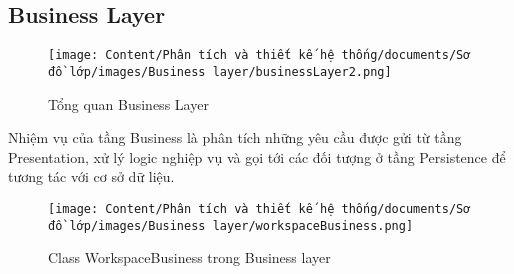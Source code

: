 \subsection{Business Layer}

\begin{figure}[H]
    \centering
    \texttt{[image: Content/Phân tích và thiết kế hệ thống/documents/Sơ đồ lớp/images/Business layer/businessLayer2.png]}
    \vspace{0.5cm}
    \caption{Tổng quan Business Layer}
    \label{fig:Tổng quan Business Layer}
\end{figure}

Nhiệm vụ của tầng Business là phân tích những yêu cầu được gửi từ tầng Presentation, xử lý logic nghiệp vụ và
gọi tới các đối tượng ở tầng Persistence để tương tác với cơ sở dữ liệu.

\begin{figure}[H]
    \centering
    \texttt{[image: Content/Phân tích và thiết kế hệ thống/documents/Sơ đồ lớp/images/Business layer/workspaceBusiness.png]}
    \vspace{0.5cm}
    \caption{Class WorkspaceBusiness trong Business layer}
    \label{fig:Class WorkspaceBusiness trong Business layer}
\end{figure}

